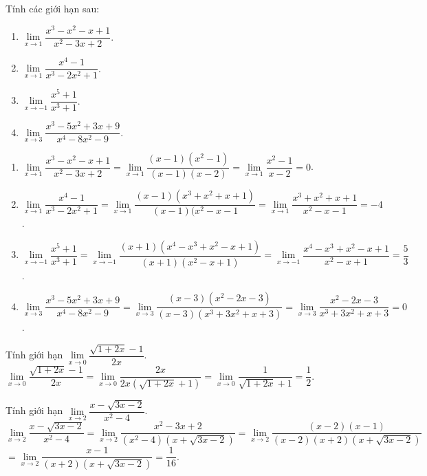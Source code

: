 \begin{bt}%
Tính các giới hạn sau:
\begin{multicols}{2}
\begin{enumerate}
\item $\lim\limits_{x \to 1}\dfrac{x^3-x^2-x+1}{x^2-3x+2}$.
\item $\lim\limits_{x \to 1}\dfrac{x^4-1}{x^3-2x^2+1}$.
\item $\lim\limits_{x \to -1}\dfrac{x^5+1}{x^3+1}$.
\item $\lim\limits_{x \to 3}\dfrac{x^3-5x^2+3x+9}{x^4-8x^2-9}$.
\end{enumerate}
\end{multicols}
\loigiai
{
\begin{enumerate}
\item $\lim\limits_{x \to 1}\dfrac{x^3-x^2-x+1}{x^2-3x+2} = \lim\limits_{x \to 1}\dfrac{(x-1)(x^2-1)}{(x-1)(x-2)} = \lim\limits_{x \to 1}\dfrac{x^2-1}{x-2} = 0$.

\item $\lim\limits_{x \to 1}\dfrac{x^4-1}{x^3-2x^2+1} = \lim\limits_{x \to 1}\dfrac{(x-1)(x^3+x^2+x+1)}{(x-1)(x^2-x-1} = \lim\limits_{x \to 1}\dfrac{x^3+x^2+x+1}{x^2-x-1} = -4$.

\item $\lim\limits_{x \to -1}\dfrac{x^5+1}{x^3+1} = \lim\limits_{x \to -1}\dfrac{(x+1)(x^4-x^3+x^2-x+1)}{(x+1)(x^2-x+1)} = \lim\limits_{x \to -1}\dfrac{x^4-x^3+x^2-x+1}{x^2-x+1} = \dfrac{5}{3}$.

\item $\lim\limits_{x \to 3}\dfrac{x^3-5x^2+3x+9}{x^4-8x^2-9} = \lim\limits_{x \to 3}\dfrac{(x-3)(x^2-2x-3)}{(x-3)(x^3+3x^2+x+3)} = \lim\limits_{x \to 3}\dfrac{x^2-2x-3}{x^3+3x^2+x+3} = 0$.

\end{enumerate}
}
\end{bt}


\begin{bt}%
Tính giới hạn $\lim\limits_{x \to 0}\dfrac{\sqrt{1+2x} - 1}{2x}$.
\loigiai
{
$\lim\limits_{x \to 0}\dfrac{\sqrt{1+2x} - 1}{2x} = \lim\limits_{x \to 0}\dfrac{2x}{2x\left(\sqrt{1+2x}+1\right)} = \lim\limits_{x \to 0}\dfrac{1}{\sqrt{1+2x}+1} = \dfrac{1}{2}$.
}
\end{bt}


\begin{bt}%
Tính giới hạn $\lim\limits_{x \to 2} \dfrac{x - \sqrt{3x-2}}{x^2 - 4}$.
\loigiai
{
$\lim\limits_{x \to 2} \dfrac{x - \sqrt{3x-2}}{x^2 - 4} = \lim\limits_{x \to 2}\dfrac{x^2 - 3x + 2}{(x^2 - 4) \left(x + \sqrt{3x-2}\right)} = \lim\limits_{x \to 2}\dfrac{(x-2)(x-1)}{(x-2)(x+2)\left(x+\sqrt{3x-2}\right)}$\\
$= \lim\limits_{x \to 2}\dfrac{x-1}{(x+2)\left(x + \sqrt{3x-2}\right)} = \dfrac{1}{16}$.
}
\end{bt}


